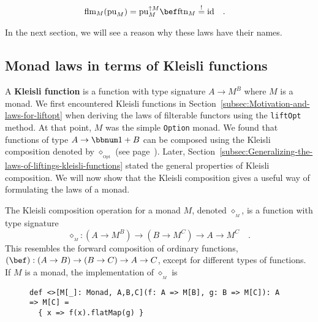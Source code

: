 ~\vspace{-0.6\baselineskip}
\begin{align}
 & \text{flm}_{M}(\text{pu}_{M})=\text{pu}_{M}^{\uparrow M}\bef\text{ftn}_{M}\overset{!}{=}\text{id}\quad.\label{eq:right-identity-law-for-flatten}
\end{align}
\vspace{-0.1\baselineskip}

In the next section, we will see a reason why these laws have their
names.

\subsection{Monad laws in terms of Kleisli functions}

A \textbf{Kleisli function} is a
function with type signature $A\rightarrow M^{B}$ where $M$ is a
monad. We first encountered Kleisli functions in Section~\ref{subsec:Motivation-and-laws-for-liftopt}
when deriving the laws of filterable functors using the \lstinline!liftOpt!
method. At that point, $M$ was the simple \lstinline!Option! monad.
We found that functions of type $A\rightarrow\bbnum 1+B$ can be composed
using the Kleisli composition denoted by $\diamond_{_{\text{Opt}}}$
(see page~\pageref{kleisli-composition}). Later, Section~\ref{subsec:Generalizing-the-laws-of-liftings-kleisli-functions}
stated the general properties of Kleisli composition. We will now
show that the Kleisli composition gives a useful way of formulating
the laws of a monad.

The Kleisli composition operation for
a monad $M$, denoted $\diamond_{_{M}}$, is a function with type
signature
\[
\diamond_{_{M}}:(A\rightarrow M^{B})\rightarrow(B\rightarrow M^{C})\rightarrow A\rightarrow M^{C}\quad.
\]
This resembles the forward composition of ordinary functions, $\left(\bef\right):\left(A\rightarrow B\right)\rightarrow\left(B\rightarrow C\right)\rightarrow A\rightarrow C$,
except for different types of functions. If $M$ is a monad, the implementation
of $\diamond_{_{M}}$ is

\begin{wrapfigure}{l}{0.67\columnwidth}%
\vspace{-0.8\baselineskip}
\begin{lstlisting}
def <>[M[_]: Monad, A,B,C](f: A => M[B], g: B => M[C]): A => M[C] =
  { x => f(x).flatMap(g) }
\end{lstlisting}
\vspace{-0.9\baselineskip}
\end{wrapfigure}%

